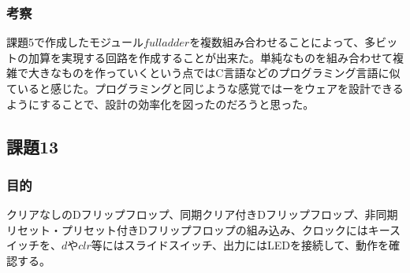 \documentclass[a4paper]{jarticle}
\begin{document}
\subsubsection{考察}
課題5で作成したモジュール$fulladder$を複数組み合わせることによって、多ビットの加算を実現する回路を作成することが出来た。単純なものを組み合わせて複雑で大きなものを作っていくという点ではC言語などのプログラミング言語に似ていると感じた。プログラミングと同じような感覚ではーをウェアを設計できるようにすることで、設計の効率化を図ったのだろうと思った。
\subsection{課題13}
\subsubsection{目的}
クリアなしのDフリップフロップ、同期クリア付きDフリップフロップ、非同期リセット・プリセット付きDフリップフロップの組み込み、クロックにはキースイッチを、$d$や$clr$等にはスライドスイッチ、出力にはLEDを接続して、動作を確認する。
\end{document}
